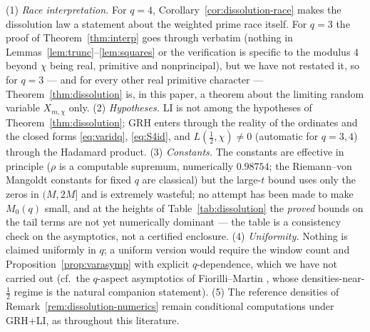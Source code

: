 \begin{remark}\label{rem:dissolution-scope}
(1) \emph{Race interpretation.} For $q=4$,
Corollary~\ref{cor:dissolution-race} makes the dissolution law a
statement about the weighted prime race itself. For $q=3$ the proof
of Theorem~\ref{thm:interp} goes through verbatim (nothing in
Lemmas~\ref{lem:trunc}--\ref{lem:squares} or the
\cite{ANS14} verification is specific to the modulus $4$ beyond
$\chi$ being real, primitive and nonprincipal), but we have not
restated it, so for $q=3$ --- and for every other real primitive
character --- Theorem~\ref{thm:dissolution} is, in this paper, a
theorem about the limiting random variable $X_{m,\chi}$ only. (2)
\emph{Hypotheses.} LI is not among the hypotheses of
Theorem~\ref{thm:dissolution}; GRH enters through the reality of the
ordinates and the closed forms \eqref{eq:varidq}, \eqref{eq:S4id},
and $L(\tfrac12,\chi)\ne0$ (automatic for $q=3,4$) through the
Hadamard product. (3) \emph{Constants.} The constants are effective
in principle ($\rho$ is a computable supremum, numerically $0.98754$;
the Riemann--von Mangoldt constants for fixed $q$ are classical) but
the large-$t$ bound uses only the zeros in $(M,2M]$ and is extremely
wasteful; no attempt has been made to make $M_0(q)$ small, and at the
heights of Table~\ref{tab:dissolution} the \emph{proved} bounds on
the tail terms are not yet numerically dominant --- the table is a
consistency check on the asymptotics, not a certified enclosure. (4)
\emph{Uniformity.} Nothing is claimed uniformly in $q$; a uniform
version would require the window count and
Proposition~\ref{prop:varasymp} with explicit $q$-dependence,
which we have not carried out (cf.\ the $q$-aspect asymptotics of
Fiorilli--Martin \cite{FM13}, whose densities-near-$\tfrac12$
regime is the natural companion statement). (5) The reference
densities of Remark~\ref{rem:dissolution-numerics} remain
conditional computations under GRH+LI, as throughout this
literature.
\end{remark}
